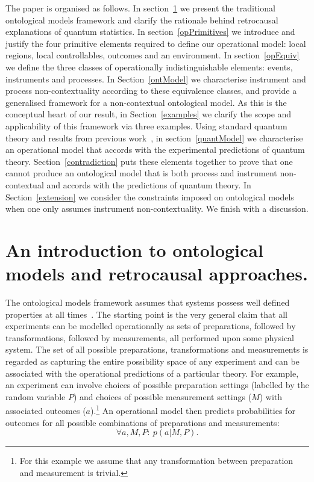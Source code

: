 \documentclass[a4paper,onecolumn,11pt,accepted=2018-05-04]{quantumarticle}
\begin{document}
The paper is organised as follows. In section~\ref{OntModels} we present the traditional ontological models framework and clarify the rationale behind retrocausal explanations of quantum statistics. In section~\ref{opPrimitives} we introduce and justify the four primitive elements required to define our operational model: local regions, local controllables, outcomes and an environment. In section~\ref{opEquiv} we define the three classes of operationally indistinguishable elements: events, instruments and processes. In Section~\ref{ontModel} we characterise instrument and process non-contextuality according to these equivalence classes, and provide a generalised framework for a non-contextual ontological model. As this is the conceptual heart of our result, in Section~\ref{examples} we clarify the scope and applicability of this framework via three examples. Using standard quantum theory and results from previous work~\cite{oreshkov12, shrapnel2017}, in section~\ref{quantModel} we characterise an operational model that accords with the experimental predictions of quantum theory. Section~\ref{contradiction} puts these elements together to prove that one cannot produce an ontological model that is both process and instrument non-contextual and accords with the predictions of quantum theory. In Section~\ref{extension} we consider the constraints imposed on ontological models when one only assumes instrument non-contextuality. We finish with a discussion.

\section{An introduction to ontological models and retrocausal approaches.}\label{OntModels}

The ontological models framework assumes that systems possess well defined properties at all times~\cite{harrigan10,leifer2014quantum, Leifer2016}. The starting point is the very general claim that all experiments can be modelled operationally as sets of preparations, followed by transformations, followed by measurements, all performed upon some physical system. The set of all possible preparations, transformations and measurements is regarded as capturing the entire possibility space of any experiment and can be associated with the operational predictions of a particular theory. 
For example, an experiment can involve choices of possible preparation settings (labelled by the random variable $P$) and choices of possible measurement settings ($M$) with associated outcomes ($a$).\footnote{For this example we assume that any transformation between preparation and measurement is trivial.} An operational model then predicts probabilities for outcomes for all possible combinations of preparations and measurements: 
\begin{equation}
\forall a,M,P:~p(a|M,P).
\end{equation}
\end{document}
